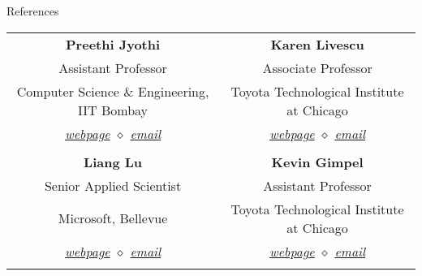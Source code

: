 \documentclass{resume} %
\begin{document}
\begin{rSection}{References}
\begin{center}
\begin{tabular}{cc}
\textbf{Preethi Jyothi} & \textbf{Karen Livescu} \\
Assistant Professor & Associate Professor \\
Computer Science \& Engineering, IIT Bombay & Toyota Technological Institute at Chicago \\
\textit{\href{https://www.cse.iitb.ac.in/~pjyothi/}{webpage} $\diamond$ \href{mailto:pjyothi@cse.iitb.ac.in}{email}}  & \textit{\href{http://ttic.uchicago.edu/~klivescu}{webpage} $\diamond$ \href{mailto:klivescu@ttic.edu}{email}}\\
\\
\textbf{Liang Lu} & \textbf{Kevin Gimpel} \\
Senior Applied Scientist & Assistant Professor \\
Microsoft, Bellevue & Toyota Technological Institute at Chicago \\
\textit{\href{http://ttic.uchicago.edu/~llu/}{webpage} $\diamond$ \href{mailto:llu@ttic.edu}{email}}  & \textit{\href{http://ttic.uchicago.edu/~kgimpel}{webpage} $\diamond$ \href{mailto:kgimpel@ttic.edu}{email}}\\
\\

\end{tabular}
\end{center}
\vspace*{-1mm}
\end{rSection}

\end{document}
